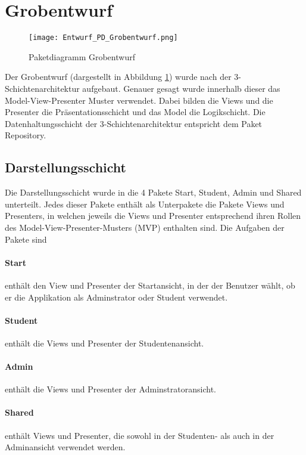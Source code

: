 \graphicspath{ {Entwurf/exports/png/} }


\section{Grobentwurf}
\begin{figure}
 \texttt{[image: Entwurf\_PD\_Grobentwurf.png]}
 \label{fig:Paketdiagramm_Grobentwurf}
 \caption{Paketdiagramm Grobentwurf}
\end{figure}

Der Grobentwurf (dargestellt in Abbildung \ref{fig:Paketdiagramm_Grobentwurf}) wurde nach der 3-Schichtenarchitektur aufgebaut. Genauer gesagt wurde innerhalb dieser das Model-View-Presenter Muster verwendet.
Dabei bilden die Views und die Presenter die Präsentationsschicht und das Model die Logikschicht. Die Datenhaltungsschicht der 3-Schichtenarchitektur entspricht dem Paket Repository.

\subsection{Darstellungsschicht}
Die Darstellungsschicht wurde in die 4 Pakete Start, Student, Admin und Shared unterteilt. Jedes dieser Pakete enthält als Unterpakete die Pakete Views und Presenters, in welchen jeweils die Views und Presenter entsprechend ihren Rollen des Model-View-Presenter-Musters (MVP) enthalten sind. Die Aufgaben der Pakete sind

\paragraph{Start} enthält den View und Presenter der Startansicht, in der der Benutzer wählt, ob er die Applikation als Adminstrator oder Student verwendet.
\paragraph{Student} enthält die Views und Presenter der Studentenansicht.
\paragraph{Admin} enthält die Views und Presenter der Adminstratoransicht.
\paragraph{Shared} enthält Views und Presenter, die sowohl in der Studenten- als auch in der Adminansicht verwendet werden.


